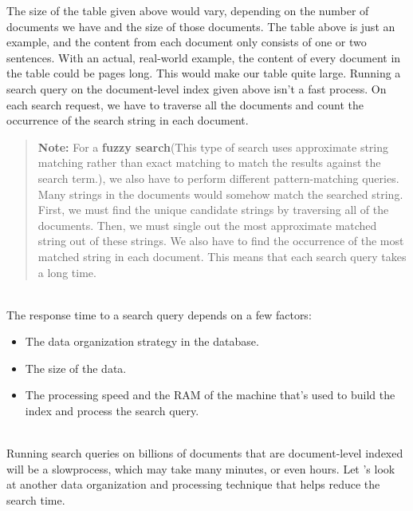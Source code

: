 The size of the table given above would vary, depending on the number of documents we have and the size of those documents. The table above is just an example, and the content from each document only consists of one or two sentences. With an actual, real-world example, the content of every document in the table could be pages long. This would make our table quite large. Running a search query on the document-level index given above isn't a fast process. On each search request, we have to traverse all the documents and count the occurrence of the search string in each document.
\begin{quote}
\textbf{Note:} For a \textbf{fuzzy search}(This type of search uses approximate string matching rather than exact matching to match the results against the search term.), we also have to perform different pattern-matching queries. Many strings in the documents would somehow match the searched string. First, we must find the unique candidate strings by traversing all of the documents. Then, we must single out the most approximate matched string out of these strings. We also have to find the occurrence of the most matched string in each document. This means that each search query takes a long time.
\end{quote}
\\
The response time to a search query depends on a few factors:

\begin{itemize}
\item
\protect{}\label{tz7VBQp_TEN5WZXiOcn_n}
The data organization strategy in the database.
\item
\protect{}\label{jDazfXHjF6GhNZsFtT-hl}
The size of the data.
\item
\protect{}\label{Ytk3n0Fvl72vX9s7NPQPm}
The processing speed and the RAM of the machine that's used to build the index and process the search query.
\end{itemize}
\\
Running search queries on billions of documents that are document-level indexed will be a slowprocess, which may take many minutes, or even hours. Let 's look at another data organization and processing technique that helps reduce the search time.
\\
